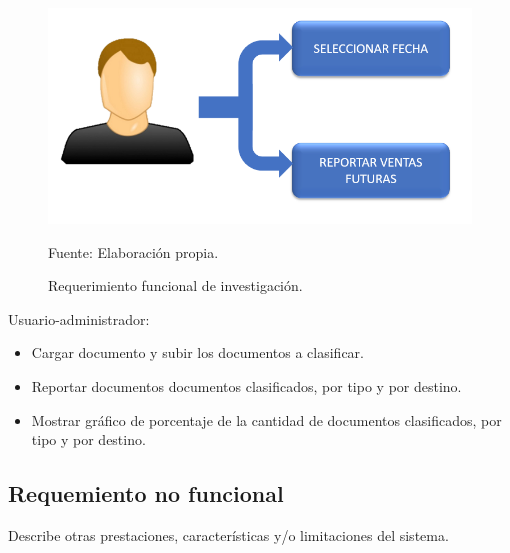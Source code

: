 \begin{figure}[h!]
	\centering
		\includegraphics[scale=0.7]{imagenes/requerimientos.png}
		\caption{Requerimiento funcional de investigación.}
	\begin{center}
    Fuente: Elaboración propia.
    \end{center}
	\label{fig:reqFuncional}
\end{figure}
\newpage
Usuario-administrador: 
\begin{itemize}
    \item Cargar documento y subir los documentos a clasificar.
    \item Reportar documentos documentos clasificados, por tipo y por destino.
    \item Mostrar gráfico de porcentaje de la cantidad de documentos clasificados, por tipo y por destino.
\end{itemize}

\subsection{Requemiento no funcional}
Describe otras prestaciones, características y/o limitaciones del sistema.

